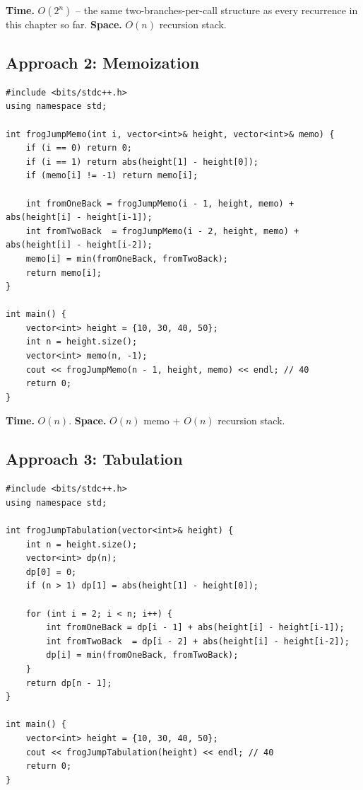 \begin{complexitybox}
\textbf{Time.} $O(2^n)$ -- the same two-branches-per-call structure as
every recurrence in this chapter so far.
\textbf{Space.} $O(n)$ recursion stack.
\end{complexitybox}

\subsection*{Approach 2: Memoization}

\begin{lstlisting}
#include <bits/stdc++.h>
using namespace std;

int frogJumpMemo(int i, vector<int>& height, vector<int>& memo) {
    if (i == 0) return 0;
    if (i == 1) return abs(height[1] - height[0]);
    if (memo[i] != -1) return memo[i];

    int fromOneBack = frogJumpMemo(i - 1, height, memo) + abs(height[i] - height[i-1]);
    int fromTwoBack  = frogJumpMemo(i - 2, height, memo) + abs(height[i] - height[i-2]);
    memo[i] = min(fromOneBack, fromTwoBack);
    return memo[i];
}

int main() {
    vector<int> height = {10, 30, 40, 50};
    int n = height.size();
    vector<int> memo(n, -1);
    cout << frogJumpMemo(n - 1, height, memo) << endl; // 40
    return 0;
}
\end{lstlisting}

\begin{complexitybox}
\textbf{Time.} $O(n)$.
\textbf{Space.} $O(n)$ memo $+$ $O(n)$ recursion stack.
\end{complexitybox}

\subsection*{Approach 3: Tabulation}

\begin{lstlisting}
#include <bits/stdc++.h>
using namespace std;

int frogJumpTabulation(vector<int>& height) {
    int n = height.size();
    vector<int> dp(n);
    dp[0] = 0;
    if (n > 1) dp[1] = abs(height[1] - height[0]);

    for (int i = 2; i < n; i++) {
        int fromOneBack = dp[i - 1] + abs(height[i] - height[i-1]);
        int fromTwoBack  = dp[i - 2] + abs(height[i] - height[i-2]);
        dp[i] = min(fromOneBack, fromTwoBack);
    }
    return dp[n - 1];
}

int main() {
    vector<int> height = {10, 30, 40, 50};
    cout << frogJumpTabulation(height) << endl; // 40
    return 0;
}
\end{lstlisting}

